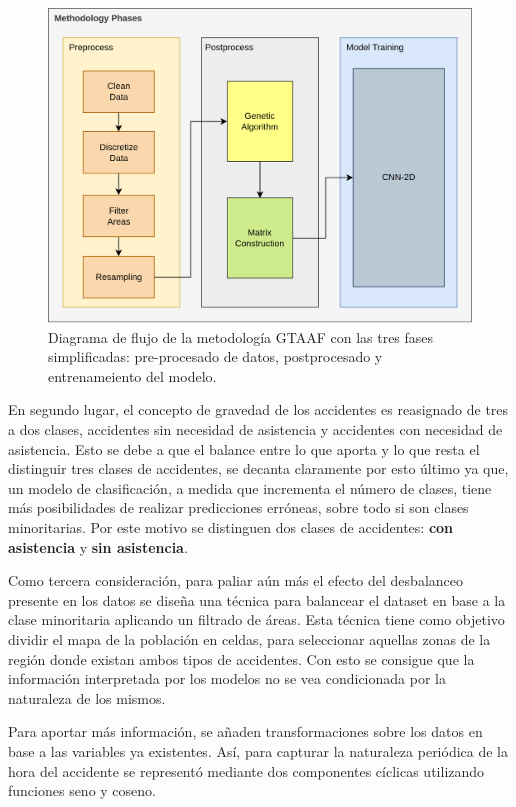 \documentclass{uathesis-es}
\begin{document}
\begin{figure}[H]
    \centering
    \includegraphics[width=14cm]{Figures/7th DataFlow Chart.png}
    \caption{Diagrama de flujo de la metodología GTAAF con las tres fases simplificadas: pre-procesado de datos, postprocesado y entrenameiento del modelo.}
    \label{DataFlow}
\end{figure}

En segundo lugar, el concepto de gravedad de los accidentes es reasignado de tres a dos clases, accidentes sin necesidad de asistencia y accidentes con necesidad de asistencia. Esto se debe a que el balance entre lo que aporta  y lo que resta el distinguir tres clases de accidentes, se decanta claramente por esto último ya que, un modelo de clasificación, a medida que incrementa el número de clases, tiene más posibilidades de realizar predicciones erróneas, sobre todo si son clases minoritarias. Por este motivo se distinguen dos clases de accidentes: \textbf{con asistencia} y \textbf{sin asistencia}.

Como tercera consideración, para paliar aún más el efecto del desbalanceo presente en los datos se diseña una técnica para balancear el dataset en base a la clase minoritaria aplicando un filtrado de áreas. Esta técnica tiene como objetivo dividir el mapa de la población en celdas, para seleccionar aquellas zonas de la región donde existan ambos tipos de accidentes. Con esto se consigue que la información interpretada por los modelos no se vea condicionada por la naturaleza de los mismos.

Para aportar más información, se añaden transformaciones sobre los datos en base a las variables ya existentes. Así, para capturar la naturaleza periódica de la hora del accidente se representó mediante dos componentes cíclicas utilizando funciones seno y coseno. 
\end{document}

